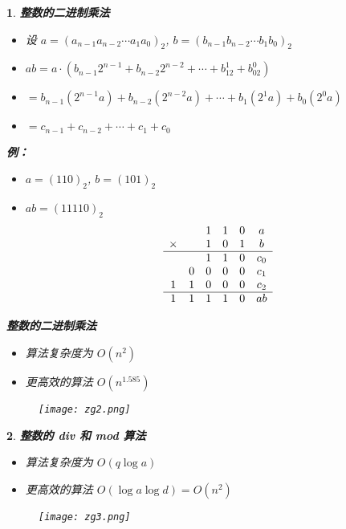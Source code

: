 \documentclass[UTF8]{report}
\theoremstyle{MyLineTheoremStyle} %
\theoremstyle{MyBlockTheoremStyle} %
\theoremstyle{MySubsubsectionStyle} %
\newtheorem{definition}{}
\begin{document}
\begin{definition}
    \textbf{整数的二进制乘法}
    \begin{itemize}
        \item 设 $a = (a_{n-1}a_{n-2} \cdots a_1a_0)_2$, $b = (b_{n-1}b_{n-2} \cdots b_1b_0)_2$
        \item $ab = a \cdot (b_{n-1}2^{n-1} + b_{n-2}2^{n-2} + \cdots + b_12^1 + b_02^0)$
        \item $= b_{n-1}(2^{n-1}a) + b_{n-2}(2^{n-2}a) + \cdots + b_1(2^1a) + b_0(2^0a)$
        \item $= c_{n-1} + c_{n-2} + \cdots + c_1 + c_0$
    \end{itemize}

    \textbf{例：}
    \begin{itemize}
        \item $a = (110)_2$, $b = (101)_2$
        \item $ab = (11110)_2$
        \[
        \begin{array}{cccccc}
          &  & 1 & 1 & 0 & a \\
        \times &  & 1 & 0 & 1 & b \\
        \hline
          &   & 1 & 1 & 0 & c_0 \\
          & 0 & 0 & 0 & 0 & c_1 \\
        1 & 1 & 0 & 0 & 0 & c_2 \\
        \hline
        1 & 1 & 1 & 1 & 0 & ab
        \end{array}
        \]
    \end{itemize}

    \textbf{整数的二进制乘法}
    \begin{itemize}
        \item 算法复杂度为 $O(n^2)$
        \item 更高效的算法 $O(n^{1.585})$
    \end{itemize}
    \begin{figure}[ht]
        \centering
        \texttt{[image: zg2.png]}
    \end{figure}
\end{definition}

\begin{definition}
    \textbf{整数的 div 和 mod 算法}
    \begin{itemize}
        \item 算法复杂度为 $O(q \log a)$
        \item 更高效的算法 $O(\log a \log d) = O(n^2)$
    \end{itemize}
    \begin{figure}[ht]
        \centering
        \texttt{[image: zg3.png]}
    \end{figure}
\end{definition}
\end{document}
